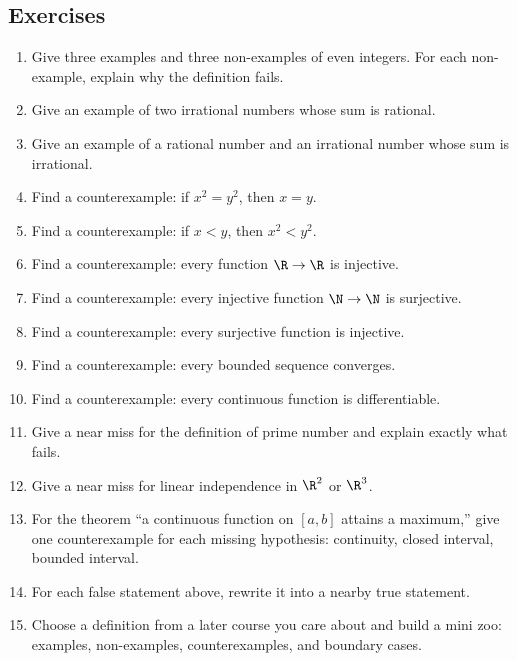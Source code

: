 \subsection{Exercises}

\begin{enumerate}
\item Give three examples and three non-examples of even integers. For each non-example, explain why the definition fails.
\item Give an example of two irrational numbers whose sum is rational.
\item Give an example of a rational number and an irrational number whose sum is irrational.
\item Find a counterexample: if $x^2=y^2$, then $x=y$.
\item Find a counterexample: if $x<y$, then $x^2<y^2$.
\item Find a counterexample: every function $\R\to\R$ is injective.
\item Find a counterexample: every injective function $\N\to\N$ is surjective.
\item Find a counterexample: every surjective function is injective.
\item Find a counterexample: every bounded sequence converges.
\item Find a counterexample: every continuous function is differentiable.
\item Give a near miss for the definition of prime number and explain exactly what fails.
\item Give a near miss for linear independence in $\R^2$ or $\R^3$.
\item For the theorem ``a continuous function on $[a,b]$ attains a maximum,'' give one counterexample for each missing hypothesis: continuity, closed interval, bounded interval.
\item For each false statement above, rewrite it into a nearby true statement.
\item Choose a definition from a later course you care about and build a mini zoo: examples, non-examples, counterexamples, and boundary cases.
\end{enumerate}
